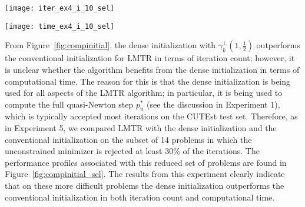   \begin{figure*}[h!]
                        \begin{minipage}{0.48\textwidth}
                                \texttt{[image: iter\_ex4\_i\_10\_sel]}

                        \end{minipage}
                        \hfill
                        \begin{minipage}{0.48\textwidth}
                                                \texttt{[image: time\_ex4\_i\_10\_sel]}
                        \end{minipage}
                        \caption{Performance profiles of 
                        \texttt{iter} (left) and
\texttt{time} (right) for Experiment 5 comparing LMTR with the dense initialization
with
$\gamma_k^{\perp}(1,\frac{1}{2})$
 to LMTR with the conventional initialization
on the subset of 14 problems in which the unconstrained minimizer is rejected at  $30\% $  of the iterations.}
                \label{fig:compinitial_sel}       
\end{figure*}


From Figure~\ref{fig:compinitial}, the dense initialization with
$\gamma_k^{\perp}(1,\frac{1}{2})$ outperforms the conventional
initialization for
{\small LMTR} in terms of iteration count; however, it is unclear
  whether the algorithm benefits from the dense initialization in terms of
  computational time.  The reason for this is that the dense initialization
  is being used for all aspects of the {\small LMTR} algorithm; in
  particular, it is being used to compute the full quasi-Newton step
  $p_u^*$ (see the discussion in Experiment 1), which is typically accepted
  most iterations on the {\small CUTE}st test set.  Therefore, as in Experiment 5, we
  compared {\small LMTR} with the dense initialization and the conventional
  initialization on the subset of 14 problems in which the unconstrained
  minimizer is rejected at least 30\% of the iterations.  The performance
  profiles associated with this reduced set of problems are found in
  Figure~\ref{fig:compinitial_sel}.  The results from this experiment
  clearly indicate that on these more difficult problems the dense
  initialization outperforms the conventional initialization in both
  iteration count and computational time.  
